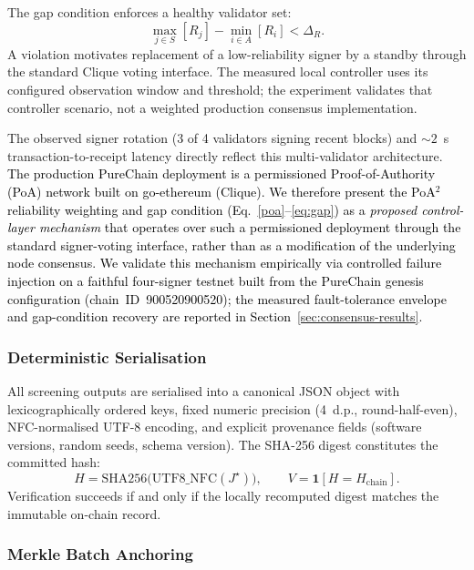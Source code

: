 \documentclass[conference]{IEEEtran}
\newcommand{\rev}[2]{#2}
\begin{document}
The gap condition enforces a healthy validator set:
\begin{equation}
\label{eq:gap}
\max_{j\in S}[R_j] - \min_{i\in A}[R_i] < \Delta_R.
\end{equation}
\rev{R1.3, R2.4}{A violation motivates replacement of a low-reliability signer by a standby through the standard Clique voting interface. The measured local controller uses its configured observation window and threshold; the experiment validates that controller scenario, not a weighted production consensus implementation.}

The observed signer rotation (3 of 4 validators signing
recent blocks) and $\rev{R2.4}{\sim 2}$~s \rev{R2.4}{transaction-to-receipt latency} directly
reflect this multi-validator architecture.
\textcolor{black}{The production PureChain deployment is a
permissioned Proof-of-Authority (PoA) network built on
go-ethereum (Clique). We therefore present the PoA$^2$
reliability weighting and gap condition
(Eq.~\ref{poa}--\ref{eq:gap}) as a \emph{proposed
control-layer mechanism} that operates over such a
permissioned deployment through the standard signer-voting
interface, rather than as a modification of the underlying
node consensus. We validate this mechanism empirically via
controlled failure injection on a faithful four-signer
testnet built from the PureChain genesis configuration
(chain~ID~900520900520); the measured fault-tolerance
envelope and gap-condition recovery are reported in
Section~\ref{sec:consensus-results}.}

\subsubsection{Deterministic Serialisation}

All screening outputs are serialised into a canonical JSON
object with lexicographically ordered keys, fixed numeric
precision (4~d.p., round-half-even), NFC-normalised UTF-8
encoding, and explicit provenance fields (software versions,
random seeds, schema version).
The SHA-256 digest constitutes the committed hash:
\begin{equation}
\label{eq:hash}
H = \mathrm{SHA256}\!\bigl(\mathrm{UTF8\_NFC}(J^\star)\bigr),
\qquad
V = \mathbf{1}[H = H_{\mathrm{chain}}].
\end{equation}
Verification succeeds if and only if the locally recomputed
digest matches the immutable on-chain record.

\subsubsection{Merkle Batch Anchoring}
\end{document}
